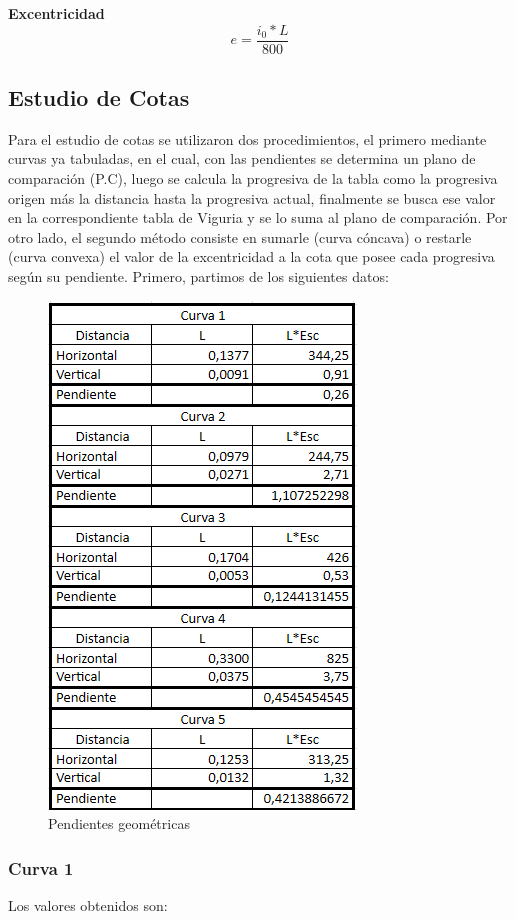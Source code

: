 \documentclass[../main.tex]{subfiles}
\begin{document}
\textbf{Excentricidad }
\begin{equation}
e = \frac{i_0 * L}{800}
\end{equation}

\subsection{Estudio de Cotas}
Para el estudio de cotas se utilizaron dos procedimientos, el primero mediante curvas ya tabuladas, en el cual, con las pendientes se determina un plano de comparación (P.C), luego se calcula la progresiva de la tabla como la progresiva origen más la distancia hasta la progresiva actual, finalmente se busca ese valor en la correspondiente tabla de Viguria y se lo suma al plano de comparación. Por otro lado, el segundo método consiste en sumarle (curva cóncava) o restarle (curva convexa) el valor de la excentricidad a la cota que posee cada progresiva según su pendiente. Primero, partimos de los siguientes datos:

\begin{figure}
    \centering
    \includegraphics{images/google_sheets/Screenshot_8.png}
    \caption{Pendientes geométricas}
    \label{fig:pendientes}
\end{figure}
\subsubsection{Curva 1}
Los valores obtenidos son:
\end{document}
